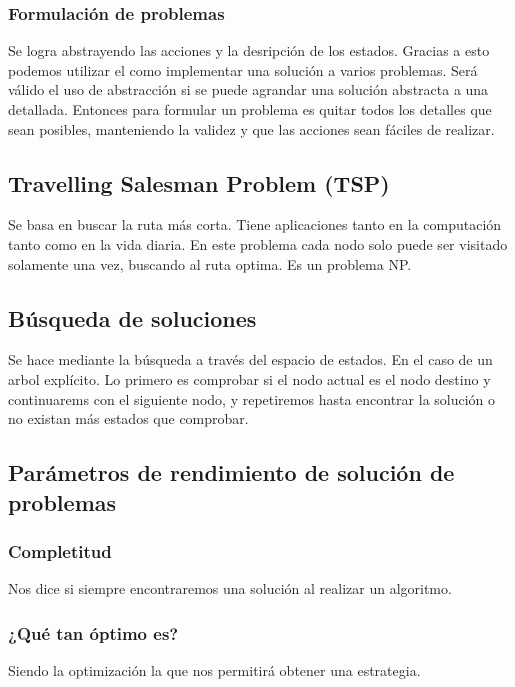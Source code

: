 \documentclass{article}
\begin{document}
\subsubsection{Formulación de problemas }

Se logra abstrayendo las acciones y la desripción de los estados. Gracias a esto podemos utilizar el como implementar una solución a varios problemas. Será válido el uso de abstracción si se puede agrandar una solución abstracta a una detallada. Entonces para formular un problema es quitar todos los detalles que sean posibles, manteniendo la validez y que las acciones sean fáciles de realizar. 

\subsection{Travelling Salesman Problem (TSP) }

Se basa en buscar la ruta más corta. Tiene aplicaciones tanto en la computación tanto como en la vida diaria. En este problema cada nodo solo puede ser visitado solamente una vez, buscando al ruta optima. Es un problema NP. 

\subsection{Búsqueda de soluciones }

Se hace mediante la búsqueda a través del espacio de estados. En el caso de un arbol explícito. Lo primero es comprobar si el nodo actual es el nodo destino y continuarems con el siguiente nodo, y repetiremos hasta encontrar la solución o no existan más estados que comprobar. 

\subsection{Parámetros de rendimiento de solución de problemas }
\subsubsection{Completitud }

Nos dice si siempre encontraremos una solución al realizar un algoritmo.

\subsubsection{¿Qué tan óptimo es? }

Siendo la optimización la que nos permitirá obtener una estrategia.
\end{document}
